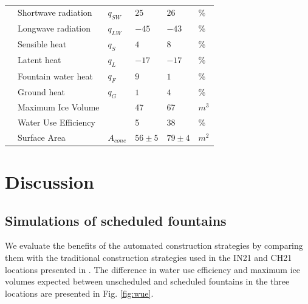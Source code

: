\documentclass[tc, manuscript]{copernicus}
\begin{document}
\begin{table}
\begin{tabular}{@{}|llllll|@{}}
                           & Shortwave radiation             &  $q_{SW}$       & $25$  & $26$ & \% \\
		\multicolumn{1}{|l|}{} & Longwave radiation              &  $q_{LW}$       & $-45$  & $-43$ & \% \\
		\multicolumn{1}{|l|}{} & Sensible heat                   &  $q_{S}$        & $4$   & $8$ & \% \\
		\multicolumn{1}{|l|}{} & Latent heat                     &  $q_{L}$        & $-17$  & $-17$ & \% \\
		\multicolumn{1}{|l|}{} & Fountain water heat             &  $q_{F}$        & $9$  & $1$     & \% \\
		\multicolumn{1}{|l|}{} & Ground heat                     &  $q_{G}$        & $1$   & $4$     & \% \\\midrule
		\multicolumn{1}{|l|}{\multirow{2}{*}{\rotatebox[origin=c]{90}{AIR}}}

		                       & Maximum Ice Volume              &                 & 47            & 67            & $m^{3}$ \\
		\multicolumn{1}{|l|}{} & Water Use Efficiency            &                 & 5             & 38            & \% \\
		\multicolumn{1}{|l|}{} & Surface Area                    &  $A_{cone}$     & $56\pm 5$  & $79 \pm 4$     &$m^{2}$ \\\midrule
	\end{tabular}
\end{table}

\section{Discussion}

\subsection{Simulations of scheduled fountains}

We evaluate the benefits of the automated construction strategies by comparing them with the traditional
construction strategies used in the IN21 and CH21 locations presented in
\cite{balasubramanianInfluenceMeteorologicalConditions2022}. The difference in water use efficiency and maximum
ice volumes expected between unscheduled and scheduled fountains in the three locations are presented in Fig.
\ref{fig:wue}.
\end{document}
